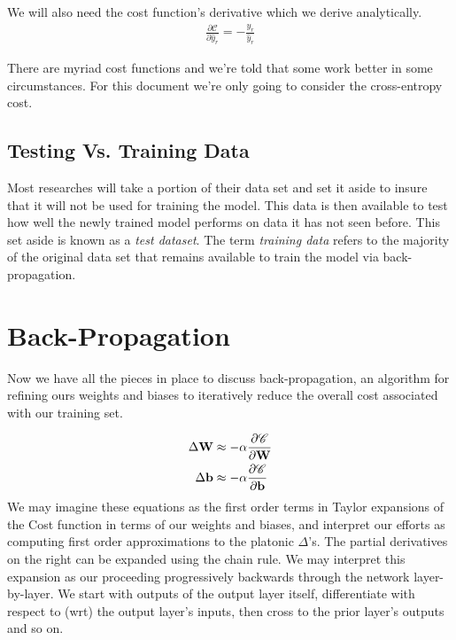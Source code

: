 \documentclass[twocolumn]{revtex4-1}
\newcommand{\bld}[1]{\vectorbold{#1}}
\newcommand{\cC}{\mathscr{C}}
\newcommand{\parpar}[2]{\frac{\partial #1}{\partial #2}}
\begin{document}
We will also need the cost function's derivative which we derive analytically.
\begin{align}
    \label{eqn:derivCost}
    \parpar{\cC}{\hat{y}_r} = - \frac{y_r}{\hat{y}_r}
\end{align}

There are myriad cost functions and we're told that some work better in some circumstances. For this document we're only going to consider the cross-entropy cost.

\subsection{Testing Vs. Training Data}
Most researches will take a portion of their data set and set it aside to insure that it will not be used for training the model. This data is then available to test how well the newly trained model performs on data it has not seen before. This set aside is known as a \textit{test dataset}. The term \textit{training data} refers to the majority of the original data set that remains available to train the model via back-propagation.

\section{Back-Propagation}
Now we have all the pieces in place to discuss back-propagation, an algorithm for refining ours weights and biases to iteratively reduce the overall cost associated with our training set. 

\begin{align}
    \label{eqn:deltas}
    \Delta \bld{W} & \approx - \alpha \parpar{\cC}{\bld{W}} \\
    \Delta \bld{b} & \approx - \alpha \parpar{\cC}{\bld{b}}
\end{align}
We may imagine these equations as the first order terms in Taylor expansions of the Cost function in terms of our weights and biases, and interpret our efforts as computing first order approximations to the platonic $\Delta$'s. The partial derivatives on the right can be expanded using the chain rule. We may interpret this expansion as our proceeding progressively backwards through the network layer-by-layer. We start with outputs of the output layer itself, differentiate with respect to (wrt) the output layer's inputs, then cross to the prior layer's outputs and so on.
\end{document}
